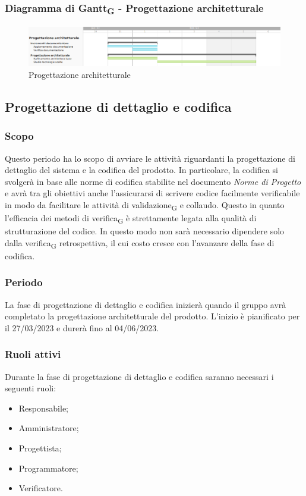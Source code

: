 \subsubsection{Diagramma di Gantt\textsubscript{G} - Progettazione architetturale}

\begin{figure}[H]
\centering
\includegraphics[width=\textwidth]{img/4_progettazione.png}
\caption{Progettazione architetturale}
\end{figure}

\subsection{Progettazione di dettaglio e codifica}
\subsubsection{Scopo}
Questo periodo ha lo scopo di avviare le attività riguardanti la progettazione di dettaglio del sistema e la codifica del prodotto.
In particolare, la codifica si svolgerà in base alle norme di codifica stabilite nel documento \textit{Norme di Progetto} e avrà tra gli obiettivi anche l’assicurarsi di scrivere codice facilmente verificabile in modo da facilitare le attività di validazione\textsubscript{G} e collaudo. Questo in quanto l'efficacia dei metodi di verifica\textsubscript{G} è strettamente legata alla qualità di strutturazione del codice. In questo modo non sarà necessario dipendere solo dalla verifica\textsubscript{G} retrospettiva, il cui costo cresce con l'avanzare della fase di codifica.

\subsubsection{Periodo}
La fase di progettazione di dettaglio e codifica inizierà quando il gruppo avrà completato la progettazione architetturale del prodotto. L'inizio è pianificato per il 27/03/2023 e durerà fino al 04/06/2023.

\subsubsection{Ruoli attivi}
Durante la fase di progettazione di dettaglio e codifica saranno necessari i seguenti ruoli:
\begin{itemize}
	\item Responsabile;
	\item Amministratore;
	\item Progettista;
	\item Programmatore;
	\item Verificatore.
\end{itemize}

